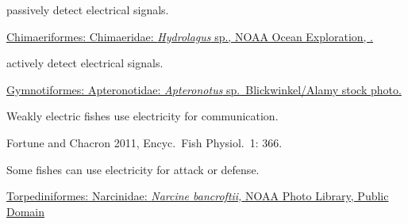 \label{key}\documentclass[t]{beamer}
\begin{document}
{
\begin{frame}[t]{ passively detect electrical signals.}

\vfill

\tinyfill \href{ https://www.flickr.com/photos/27077560@N05/49203331708}{Chimaeriformes: Chimaeridae: \textit{Hydrolagus} sp., NOAA Ocean Exploration, .}

\end{frame}
}

{
\begin{frame}[t]{ actively detect electrical signals.}

\vfill

\tinyfill \textcolor{white}{ \href{https://www.science.org/content/article/how-ghost-knifefish-became-fastest-electrical-discharger-animal-kingdom}{Gymnotiformes: Apteronotidae: \textit{Apteronotus} sp. \textcopyright\,Blickwinkel/Alamy stock photo.}}

\end{frame}
}

{
\begin{frame}[t]{Weakly electric fishes use electricity for communication.}

\vfill

\tinyfill Fortune and Chacron 2011, Encyc.~Fish Physiol.~1: 366.

\end{frame}
}

{
\begin{frame}[t]{Some fishes can use electricity for attack or defense.}

\vfill

\tinyfill \href{https://commons.wikimedia.org/w/index.php?curid=17940959}{Torpediniformes: Narcinidae: \textit{Narcine bancroftii,} NOAA Photo Library, Public Domain}

\end{frame}
}
\end{document}
